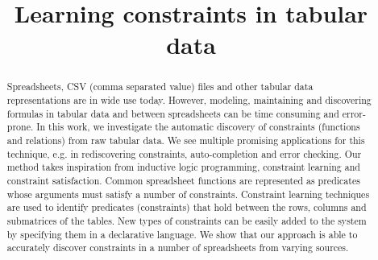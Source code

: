 \documentclass{sig-alternate-05-2015}
\begin{document}
\title{Learning constraints in tabular data}


\maketitle

\begin{abstract}
Spreadsheets, CSV (comma separated value) files and other tabular data representations are in wide use today. However, modeling, maintaining and discovering formulas in tabular data and between spreadsheets can be time consuming and error-prone. In this work, we investigate the automatic discovery of constraints (functions and relations) from raw tabular data. We see multiple promising applications for this technique, e.g. in rediscovering constraints, auto-completion and error checking. Our method takes inspiration from inductive logic programming, constraint learning and constraint satisfaction. Common spreadsheet functions are represented as predicates whose arguments must satisfy a number of constraints. Constraint learning techniques are used to identify predicates (constraints) that hold between the rows, columns and submatrices of the tables. New types of constraints can be easily added to the system by specifying them in a declarative language. We show that our approach is able to accurately discover constraints in a number of spreadsheets from varying sources.
\end{abstract}
\end{document}
